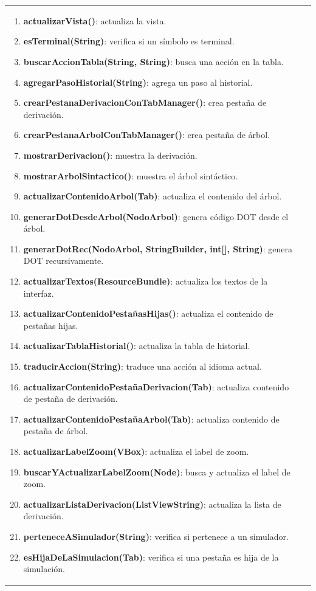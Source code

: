 \begin{longtable}[H]{|>{\columncolor[rgb]{0.63,0.79,0.95}}m{6cm} | m{8.5cm} |}
\begin{enumerate}
 		\item \textbf{actualizarVista()}: actualiza la vista.
 		\item \textbf{esTerminal(String)}: verifica si un símbolo es terminal.
 		\item \textbf{buscarAccionTabla(String, String)}: busca una acción en la tabla.
 		\item \textbf{agregarPasoHistorial(String)}: agrega un paso al historial.
 		\item \textbf{crearPestanaDerivacionConTabManager()}: crea pestaña de derivación.
 		\item \textbf{crearPestanaArbolConTabManager()}: crea pestaña de árbol.
 		\item \textbf{mostrarDerivacion()}: muestra la derivación.
 		\item \textbf{mostrarArbolSintactico()}: muestra el árbol sintáctico.
 		\item \textbf{actualizarContenidoArbol(Tab)}: actualiza el contenido del árbol.
 		\item \textbf{generarDotDesdeArbol(NodoArbol)}: genera código DOT desde el árbol.
 		\item \textbf{generarDotRec(NodoArbol, StringBuilder, int[], String)}: genera DOT recursivamente.
 		\item \textbf{actualizarTextos(ResourceBundle)}: actualiza los textos de la interfaz.
 		\item \textbf{actualizarContenidoPestañasHijas()}: actualiza el contenido de pestañas hijas.
 		\item \textbf{actualizarTablaHistorial()}: actualiza la tabla de historial.
 		\item \textbf{traducirAccion(String)}: traduce una acción al idioma actual.
 		\item \textbf{actualizarContenidoPestañaDerivacion(Tab)}: actualiza contenido de pestaña de derivación.
 		\item \textbf{actualizarContenidoPestañaArbol(Tab)}: actualiza contenido de pestaña de árbol.
 		\item \textbf{actualizarLabelZoom(VBox)}: actualiza el label de zoom.
 		\item \textbf{buscarYActualizarLabelZoom(Node)}: busca y actualiza el label de zoom.
 		\item \textbf{actualizarListaDerivacion(ListView\<String\>)}: actualiza la lista de derivación.
 		\item \textbf{perteneceASimulador(String)}: verifica si pertenece a un simulador.
 		\item \textbf{esHijaDeLaSimulacion(Tab)}: verifica si una pestaña es hija de la simulación.

\end{enumerate}
\end{longtable}
